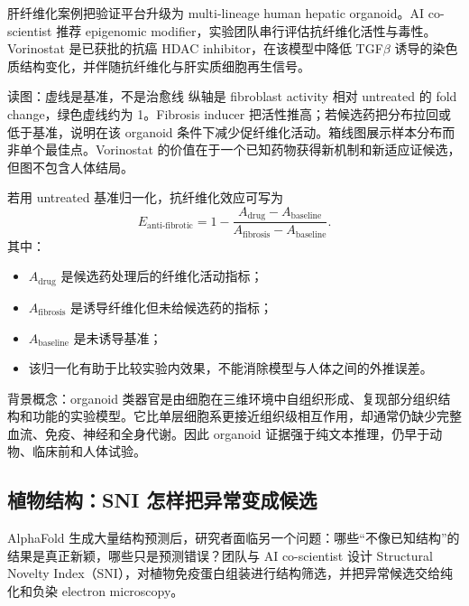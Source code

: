肝纤维化案例把验证平台升级为 multi-lineage human hepatic organoid。AI co-scientist 推荐 epigenomic modifier，实验团队串行评估抗纤维化活性与毒性。Vorinostat 是已获批的抗癌 HDAC inhibitor，在该模型中降低 TGF$\beta$ 诱导的染色质结构变化，并伴随抗纤维化与肝实质细胞再生信号。


\begin{knowledgebox}{读图：虚线是基准，不是治愈线}
纵轴是 fibroblast activity 相对 untreated 的 fold change，绿色虚线约为 1。Fibrosis inducer 把活性推高；若候选药把分布拉回或低于基准，说明在该 organoid 条件下减少促纤维化活动。箱线图展示样本分布而非单个最佳点。Vorinostat 的价值在于一个已知药物获得新机制和新适应证候选，但图不包含人体结局。
\end{knowledgebox}

若用 untreated 基准归一化，抗纤维化效应可写为
$$
E_{\text{anti-fibrotic}}
=1-\frac{A_{\text{drug}}-A_{\text{baseline}}}
{A_{\text{fibrosis}}-A_{\text{baseline}}}.
$$
其中：
\begin{itemize}
  \item $A_{\text{drug}}$ 是候选药处理后的纤维化活动指标；
  \item $A_{\text{fibrosis}}$ 是诱导纤维化但未给候选药的指标；
  \item $A_{\text{baseline}}$ 是未诱导基准；
  \item 该归一化有助于比较实验内效果，不能消除模型与人体之间的外推误差。
\end{itemize}

\begin{knowledgebox}{背景概念：organoid}
类器官是由细胞在三维环境中自组织形成、复现部分组织结构和功能的实验模型。它比单层细胞系更接近组织级相互作用，却通常仍缺少完整血流、免疫、神经和全身代谢。因此 organoid 证据强于纯文本推理，仍早于动物、临床前和人体试验。
\end{knowledgebox}


\subsection{植物结构：SNI 怎样把异常变成候选}

AlphaFold 生成大量结构预测后，研究者面临另一个问题：哪些“不像已知结构”的结果是真正新颖，哪些只是预测错误？团队与 AI co-scientist 设计 Structural Novelty Index（SNI），对植物免疫蛋白组装进行结构筛选，并把异常候选交给纯化和负染 electron microscopy。

